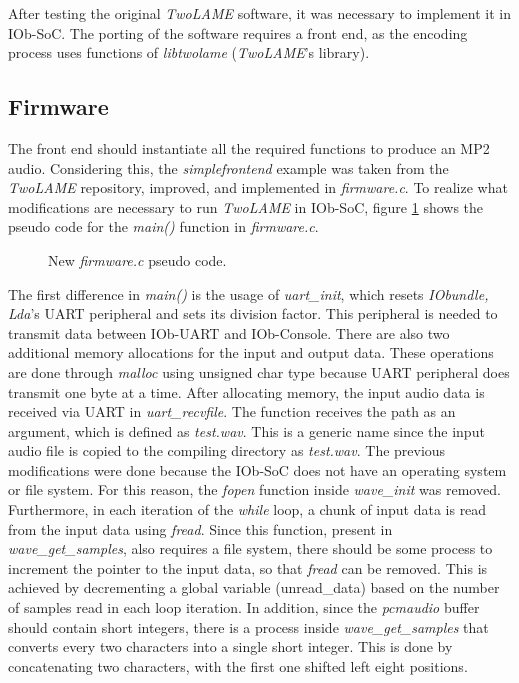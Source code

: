 After testing the original \textit{TwoLAME} software, it was necessary to implement it in IOb-SoC. The porting of the software requires a front end, as the encoding process uses functions of \textit{libtwolame} (\textit{TwoLAME}'s library). 

\subsection{Firmware}

The front end should instantiate all the required functions to produce an MP2 audio. Considering this, the \textit{simplefrontend} example was taken from the \textit{TwoLAME} repository, improved, and implemented in \textit{firmware.c}.
To realize what modifications are necessary to run \textit{TwoLAME} in IOb-SoC, figure \ref{newpseudo} shows the pseudo code for the \textit{main()} function in \textit{firmware.c}.

\begin{figure}[H]
\centerline{}
\caption{New \textit{firmware.c} pseudo code.}
\label{newpseudo}
\end{figure}

The first difference in \textit{main()} is the usage of \textit{uart\_init}, which resets \textit{IObundle, Lda}’s UART peripheral and sets its division factor. This peripheral is needed to transmit data between IOb-UART and IOb-Console. 
There are also two additional memory allocations for the input and output data. These operations are done through \textit{malloc} using unsigned char type because UART peripheral does transmit one byte at a time.
After allocating memory, the input audio data is received via UART in \textit{uart\_recvfile}. The function receives the path as an argument, which is defined as \textit{test.wav}. This is a generic name since the input audio file is copied to the compiling directory as \textit{test.wav}.
The previous modifications were done because the IOb-SoC does not have an operating system or file system. For this reason, the \textit{fopen} function inside \textit{wave\_init} was removed. Furthermore, in each iteration of the \textit{while} loop, a chunk of input data is read from the input data using \textit{fread}. Since this function, present in \textit{wave\_get\_samples}, also requires a file system, there should be some process to increment the pointer to the input data, so that \textit{fread} can be removed. This is achieved by decrementing a global variable (unread\_data) based on the number of samples read in each loop iteration. In addition, since the \textit{pcmaudio} buffer should contain short integers, there is a process inside \textit{wave\_get\_samples} that converts every two characters into a single short integer. This is done by concatenating two characters, with the first one shifted left eight positions.

